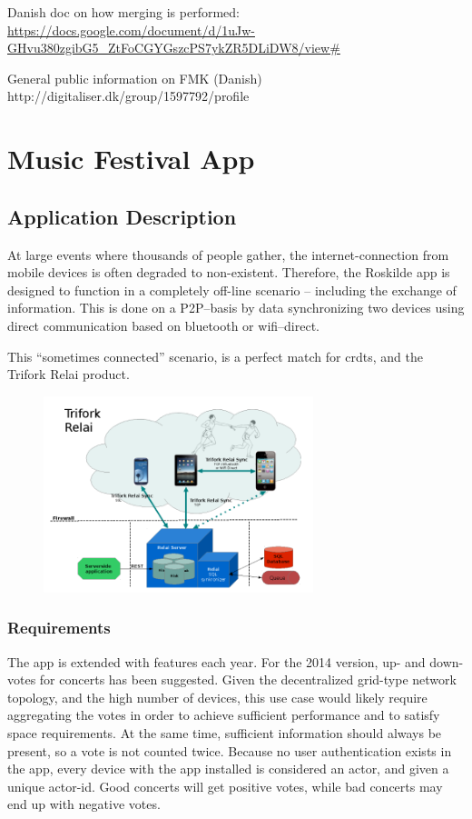 \documentclass[11pt,a4paper]{report}
\begin{document}
Danish doc on how merging is performed:
\url{https://docs.google.com/document/d/1uJw-GHvu380zgibG5_ZtFoCGYGszcPS7ykZR5DLiDW8/view#}

General public information on FMK (Danish)
http://digitaliser.dk/group/1597792/profile

\section{Music Festival App}

\subsection{Application Description}
At large events where thousands of people gather, the internet-connection from mobile devices is often degraded to non-existent. Therefore, the Roskilde app is designed to function in a completely off-line scenario -- including the exchange of information. This is done on a P2P--basis by data synchronizing two devices using  direct communication based on bluetooth or wifi--direct.

This ``sometimes connected'' scenario, is a perfect match for \glspl{crdt}, and the Trifork Relai product.

\begin{figure}[!h]
	\centering
	\includegraphics[width=0.7\textwidth]{./img/image4.png}
\end{figure}

\subsubsection{Requirements}
The app is extended with features each year. For the 2014 version, up- and down-votes for concerts has been suggested. Given the decentralized grid-type network topology, and the high number of devices, this use case would likely require aggregating the votes in order to achieve sufficient performance and to satisfy space requirements.
At the same time, sufficient information should always be present, so a vote is not counted twice. Because no user authentication exists in the app, every device with the app installed is considered an actor, and given a unique actor-id.
Good concerts will get positive votes, while bad concerts may end up with negative votes.
\end{document}
